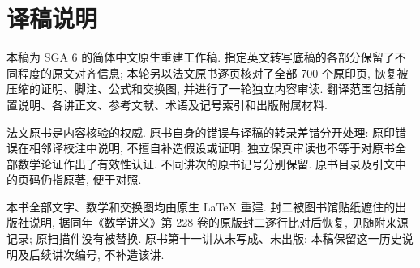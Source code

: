\section*{译稿说明}
本稿为 SGA 6 的简体中文原生重建工作稿. 指定英文转写底稿的各部分保留了不同程度的原文对齐信息; 本轮另以法文原书逐页核对了全部 700 个原印页, 恢复被压缩的证明、脚注、公式和交换图, 并进行了一轮独立内容审读. 翻译范围包括前置说明、各讲正文、参考文献、术语及记号索引和出版附属材料.

法文原书是内容核验的权威. 原书自身的错误与译稿的转录差错分开处理: 原印错误在相邻译校注中说明, 不擅自补造假设或证明. 独立保真审读也不等于对原书全部数学论证作出了有效性认证. 不同讲次的原书记号分别保留. 原书目录及引文中的页码仍指原著, 便于对照.

本书全部文字、数学和交换图均由原生 LaTeX 重建. 封二被图书馆贴纸遮住的出版社说明, 据同年《数学讲义》第 228 卷的原版封二逐行比对后恢复, 见随附来源记录; 原扫描件没有被替换. 原书第十一讲从未写成、未出版; 本稿保留这一历史说明及后续讲次编号, 不补造该讲.
\clearpage
